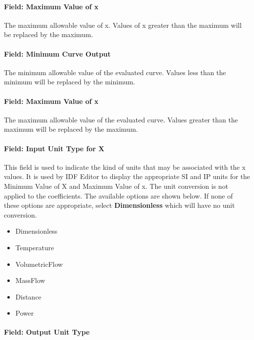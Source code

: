 \paragraph{Field: Maximum Value of x}\label{field-maximum-value-of-x-4}

The maximum allowable value of x. Values of x greater than the maximum will be replaced by the maximum.

\paragraph{Field: Minimum Curve Output}\label{field-minimum-curve-output-3}

The minimum allowable value of the evaluated curve. Values less than the minimum will be replaced by the minimum.

\paragraph{Field: Maximum Value of x}\label{field-maximum-value-of-x-5}

The maximum allowable value of the evaluated curve. Values greater than the maximum will be replaced by the maximum.

\paragraph{Field: Input Unit Type for X}\label{field-input-unit-type-for-x-4}

This field is used to indicate the kind of units that may be associated with the x values. It is used by IDF Editor to display the appropriate SI and IP units for the Minimum Value of X and Maximum Value of x. The unit conversion is not applied to the coefficients. The available options are shown below. If none of these options are appropriate, select \textbf{Dimensionless} which will have no unit conversion.

\begin{itemize}
\item
  Dimensionless
\item
  Temperature
\item
  VolumetricFlow
\item
  MassFlow
\item
  Distance
\item
  Power
\end{itemize}

\paragraph{Field: Output Unit Type}\label{field-output-unit-type-3}

